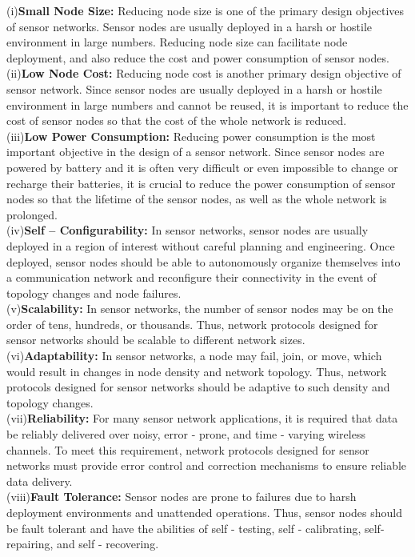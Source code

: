 \begin{justify}
(i)\textbf{Small Node Size:} Reducing node size is one of the primary design objectives of sensor networks. Sensor nodes are usually deployed in a harsh or hostile environment in large numbers. Reducing node size can facilitate node deployment, and also reduce the cost and power consumption of sensor nodes.\\
(ii)\textbf{Low Node Cost:} Reducing node cost is another primary design objective of sensor network. Since sensor nodes are usually deployed in a harsh or hostile environment in large numbers and cannot be reused, it is important to reduce the cost of sensor nodes so that the cost of the whole network is reduced.\\
(iii)\textbf{Low Power Consumption:} Reducing power consumption is the most important objective in the design of a sensor network. Since sensor nodes are powered by battery and it is often very difficult or even impossible to change or recharge their batteries, it is crucial to reduce the power consumption of sensor nodes so that the lifetime of the sensor nodes, as well as the whole network is prolonged.\\
(iv)\textbf{Self – Configurability:} In sensor networks, sensor nodes are usually deployed in a region of interest without careful planning and engineering. Once deployed, sensor nodes should be able to autonomously organize themselves into a communication network and reconfigure their connectivity in the event of topology changes and node failures.\\
(v)\textbf{Scalability:} In sensor networks, the number of sensor nodes may be on the order of tens, hundreds, or thousands. Thus, network protocols designed for sensor networks should be scalable to different network sizes.\\
(vi)\textbf{Adaptability:} In sensor networks, a node may fail, join, or move, which would result in changes in node density and network topology. Thus, network protocols designed for sensor networks should be adaptive to such density and topology changes.\\
(vii)\textbf{Reliability:} For many sensor network applications, it is required that data be reliably delivered over noisy, error - prone, and time - varying wireless channels. To meet this requirement, network protocols designed for sensor networks must provide error control and correction mechanisms to ensure reliable data delivery.\\
(viii)\textbf{Fault Tolerance:} Sensor nodes are prone to failures due to harsh deployment environments and unattended operations. Thus, sensor nodes should be fault tolerant and have the abilities of self - testing, self - calibrating, self-repairing, and self - recovering.\\

\end{justify}
